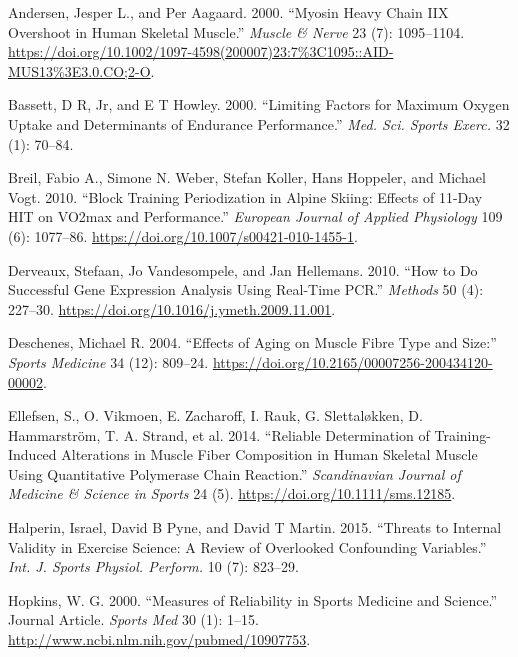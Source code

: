 \documentclass[
  letterpaper,
  DIV=11,
  numbers=noendperiod]{scrreprt}
\newlength{\cslhangindent}
\newenvironment{CSLReferences}[2] %
 {\begin{list}{}{%
  \setlength{\itemindent}{0pt}
  \setlength{\leftmargin}{0pt}
  \setlength{\parsep}{0pt}
  \ifodd #1
   \setlength{\leftmargin}{\cslhangindent}
   \setlength{\itemindent}{-1\cslhangindent}
  \fi
  \setlength{\itemsep}{#2\baselineskip}}}
 {\end{list}}
\begin{document}
\label{refs}
\begin{CSLReferences}{1}{0}
Andersen, Jesper L., and Per Aagaard. 2000. {``Myosin Heavy Chain IIX
Overshoot in Human Skeletal Muscle.''} \emph{Muscle \& Nerve} 23 (7):
1095--1104.
\url{https://doi.org/10.1002/1097-4598(200007)23:7\%3C1095::AID-MUS13\%3E3.0.CO;2-O}.

Bassett, D R, Jr, and E T Howley. 2000. {``Limiting Factors for Maximum
Oxygen Uptake and Determinants of Endurance Performance.''} \emph{Med.
Sci. Sports Exerc.} 32 (1): 70--84.

Breil, Fabio A., Simone N. Weber, Stefan Koller, Hans Hoppeler, and
Michael Vogt. 2010. {``Block Training Periodization in Alpine Skiing:
Effects of 11-Day HIT on VO2max and Performance.''} \emph{European
Journal of Applied Physiology} 109 (6): 1077--86.
\url{https://doi.org/10.1007/s00421-010-1455-1}.

Derveaux, Stefaan, Jo Vandesompele, and Jan Hellemans. 2010. {``How to
Do Successful Gene Expression Analysis Using Real-Time PCR.''}
\emph{Methods} 50 (4): 227--30.
\url{https://doi.org/10.1016/j.ymeth.2009.11.001}.

Deschenes, Michael R. 2004. {``Effects of Aging on Muscle Fibre Type and
Size:''} \emph{Sports Medicine} 34 (12): 809--24.
\url{https://doi.org/10.2165/00007256-200434120-00002}.

Ellefsen, S., O. Vikmoen, E. Zacharoff, I. Rauk, G. Slettaløkken, D.
Hammarström, T. A. Strand, et al. 2014. {``Reliable Determination of
Training{-}Induced Alterations in Muscle Fiber Composition in Human
Skeletal Muscle Using Quantitative Polymerase Chain Reaction.''}
\emph{Scandinavian Journal of Medicine \& Science in Sports} 24 (5).
\url{https://doi.org/10.1111/sms.12185}.

Halperin, Israel, David B Pyne, and David T Martin. 2015. {``Threats to
Internal Validity in Exercise Science: A Review of Overlooked
Confounding Variables.''} \emph{Int. J. Sports Physiol. Perform.} 10
(7): 823--29.

Hopkins, W. G. 2000. {``Measures of Reliability in Sports Medicine and
Science.''} Journal Article. \emph{Sports Med} 30 (1): 1--15.
\url{http://www.ncbi.nlm.nih.gov/pubmed/10907753}.


\end{CSLReferences}
\end{document}
